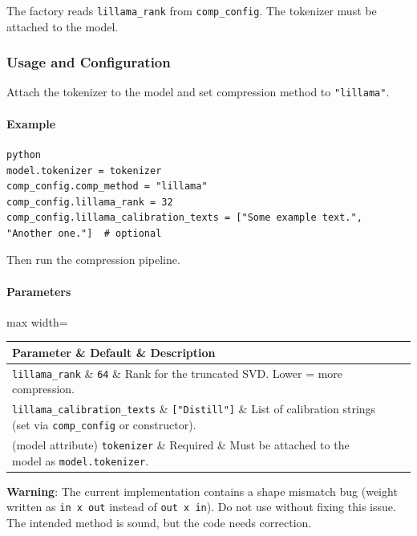 The factory reads \texttt{lillama\_rank} from \texttt{comp\_config}. The tokenizer must be attached to the model.


\subsubsection*{Usage and Configuration}

Attach the tokenizer to the model and set compression method to \texttt{"lillama"}.

\paragraph{Example}

\vspace{0.5em}
\begin{mdframed}[backgroundcolor=codebg, linecolor=codeframe, linewidth=1pt, roundcorner=4pt, innerleftmargin=2pt, innerrightmargin=5pt, innertopmargin=5pt, innerbottommargin=5pt]
\begin{lstlisting}
python
model.tokenizer = tokenizer
comp_config.comp_method = "lillama"
comp_config.lillama_rank = 32
comp_config.lillama_calibration_texts = ["Some example text.", "Another one."]  # optional
\end{lstlisting}
\end{mdframed}
\vspace{0.5em}

Then run the compression pipeline.

\paragraph{Parameters}

\begin{center}
\begin{adjustbox}{max width=\columnwidth}
\renewcommand{\arraystretch}{1.2}
\begin{tabular}{lll}
\toprule
Parameter \& Default \& Description \\
\midrule
\texttt{lillama\_rank} \& \texttt{64} \& Rank for the truncated SVD. Lower = more compression. \\
\texttt{lillama\_calibration\_texts} \& \texttt{["Distill"]} \& List of calibration strings (set via \texttt{comp\_config} or constructor). \\
(model attribute) \texttt{tokenizer} \& Required \& Must be attached to the model as \texttt{model.tokenizer}. \\

\bottomrule
\end{tabular}
\end{adjustbox}
\end{center}
\textbf{Warning}: The current implementation contains a shape mismatch bug (weight written as \texttt{in x out} instead of \texttt{out x in}). Do not use without fixing this issue. The intended method is sound, but the code needs correction.


